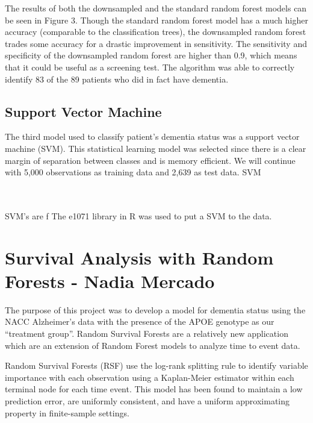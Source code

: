 \documentclass[a4paper,man,natbib,11pt]{article}
\begin{document}
The results of both the downsampled and the standard random forest models can be seen in Figure 3. Though the standard random forest model has a much higher accuracy (comparable to the classification trees), the downsampled random forest trades some accuracy for a drastic improvement in sensitivity. The sensitivity and specificity of the downsampled random forest are higher than 0.9, which means that it could be useful as a screening test. The algorithm was able to correctly identify 83 of the 89 patients who did in fact have dementia.

\subsection{Support Vector Machine}
The third model used to classify patient's dementia status was a support vector machine (SVM). This statistical learning model was selected since there is a clear margin of separation between classes and is  memory efficient. We will continue with 5,000  observations as training data and 2,639 as test data. SVM

\\~\\ SVM's are f
The e1071 library in R was used to put a SVM to the data. 

\newpage

\section{Survival Analysis with Random Forests - Nadia Mercado}

The purpose of this project was to develop a model for dementia status using the NACC Alzheimer's data with the presence of the APOE genotype as our ``treatment group''. Random Survival Forests are a relatively new application which are an extension of Random Forest models to analyze time to event data. 

Random Survival Forests (RSF) use the log-rank splitting rule to identify variable importance with each observation using a Kaplan-Meier estimator within each terminal node for each time event. This model has been found to maintain a low prediction error, are uniformly consistent, and have a uniform approximating property in finite-sample settings. 
\end{document}
